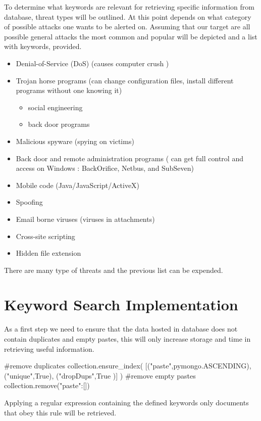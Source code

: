 \documentclass[12pt]{article}
\begin{document}
To determine what keywords are relevant for retrieving specific information from database, threat types will be outlined. At this point depends on what category of possible attacks one wants to be alerted on. Assuming that our target are all possible general attacks the most common and popular will be depicted and a list with keywords, provided. 

\begin{itemize}
\item Denial-of-Service (DoS) (causes computer crush )
\item Trojan horse programs (can change configuration files, install different programs without one knowing it)
\begin{itemize}
\item social engineering
\item back door programs
\end{itemize}
\item Malicious spyware (spying on victims) 
\item Back door and remote administration programs ( can get full control and access on Windows : BackOrifice, Netbus, and SubSeven) 
\item Mobile code (Java/JavaScript/ActiveX)
\item Spoofing
\item Email borne viruses (viruses in attachments)
\item Cross-site scripting
\item Hidden file extension
\end{itemize}

There are many type of threats and the previous list can be expended.  
\newpage
\section{Keyword Search Implementation}
As a first step we need to ensure that the data hosted in database does not contain duplicates and empty pastes, this will only increase storage and time in retrieving useful information.
\begin{spverbatim}
#remove duplicates
collection.ensure_index( [("paste",pymongo.ASCENDING),
 ("unique",True), ("dropDups",True )] )
#remove empty pastes
collection.remove({"paste":[]})
\end{spverbatim}
\hfill \break
Applying a regular expression containing the defined keywords only documents that obey this rule will be retrieved.
\begin{spverbatim}
\end{spverbatim}
\end{document}
